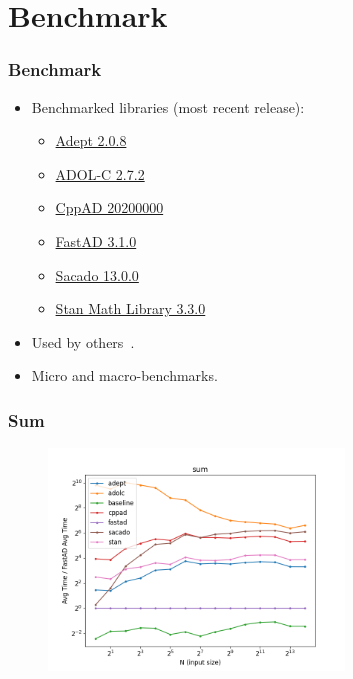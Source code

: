 \section{Benchmark}\label{sec:benchmark}
\frame{\tableofcontents[currentsection]}

\begin{frame}
\frametitle{Benchmark}
\begin{itemize}
\item Benchmarked libraries (most recent release):
\begin{itemize}
    \item \href{http://www.met.reading.ac.uk/clouds/adept/}{Adept 2.0.8}~\cite{hogan:2014}
    \item \href{https://github.com/coin-or/ADOL-C}{ADOL-C 2.7.2}~\cite{griewank:1996}
    \item \href{https://coin-or.github.io/CppAD/doc/cppad.htm}{CppAD 20200000}~\cite{bell:2020}
    \item \href{https://github.com/JamesYang007/FastAD}{FastAD 3.1.0}
    \item \href{https://github.com/trilinos/Trilinos/tree/master/packages/sacado}{Sacado 13.0.0}~\cite{phipps:2009}
    \item \href{https://github.com/stan-dev/math}{Stan Math Library 3.3.0}~\cite{carpenter:2015}
\end{itemize}
\item Used by others~\cite{carpenter:2015}\cite{margossian:2018}\cite{hogan:2014}.
\item Micro and macro-benchmarks.
\end{itemize}
\end{frame}

\begin{frame}
\frametitle{Sum}

\begin{figure}
    \includegraphics[width=0.7\textwidth]{../../figs/sum_fig.png}
\end{figure}
    
\end{frame}

